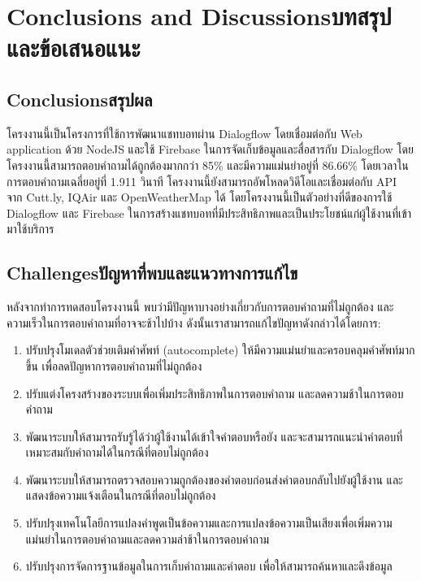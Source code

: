 \chapter{\ifenglish Conclusions and Discussions\else บทสรุปและข้อเสนอแนะ\fi}

\section{\ifenglish Conclusions\else สรุปผล\fi}

โครงงานนี้เป็นโครงการที่ใช้การพัฒนาแชทบอทผ่าน Dialogflow โดยเชื่อมต่อกับ Web application ด้วย NodeJS และใช้ Firebase
ในการจัดเก็บข้อมูลและสื่อสารกับ Dialogflow โดยโครงงานนี้สามารถตอบคำถามได้ถูกต้องมากกว่า 85\% และมีความแม่นยำอยู่ที่ 86.66\%
โดยเวลาในการตอบคำถามเฉลี่ยอยู่ที่ 1.911 วินาที โครงงานนี้ยังสามารถอัพโหลดวิดีโอและเชื่อมต่อกับ API จาก Cutt.ly, IQAir และ
OpenWeatherMap ได้ โดยโครงงานนี้เป็นตัวอย่างที่ดีของการใช้ Dialogflow และ Firebase
ในการสร้างแชทบอทที่มีประสิทธิภาพและเป็นประโยชน์แก่ผู้ใช้งานที่เข้ามาใช้บริการ

\section{\ifenglish Challenges\else ปัญหาที่พบและแนวทางการแก้ไข\fi}

หลังจากทำการทดสอบโครงงานนี้ พบว่ามีปัญหาบางอย่างเกี่ยวกับการตอบคำถามที่ไม่ถูกต้อง
และความเร็วในการตอบคำถามที่อาจจะช้าไปบ้าง ดังนั้นเราสามารถแก้ไขปัญหาดังกล่าวได้โดยการ:
\begin{enumerate}
  \item ปรับปรุงโมเดลตัวช่วยเติมคำศัพท์ (autocomplete) ให้มีความแม่นยำและครอบคลุมคำศัพท์มากขึ้น เพื่อลดปัญหาการตอบคำถามที่ไม่ถูกต้อง
  \item ปรับแต่งโครงสร้างของระบบเพื่อเพิ่มประสิทธิภาพในการตอบคำถาม และลดความช้าในการตอบคำถาม
  \item พัฒนาระบบให้สามารถรับรู้ได้ว่าผู้ใช้งานได้เข้าใจคำตอบหรือยัง และจะสามารถแนะนำคำตอบที่เหมาะสมกับคำถามได้ในกรณีที่ตอบไม่ถูกต้อง
  \item พัฒนาระบบให้สามารถตรวจสอบความถูกต้องของคำตอบก่อนส่งคำตอบกลับไปยังผู้ใช้งาน และแสดงข้อความแจ้งเตือนในกรณีที่ตอบไม่ถูกต้อง
  \item ปรับปรุงเทคโนโลยีการแปลงคำพูดเป็นข้อความและการแปลงข้อความเป็นเสียงเพื่อเพิ่มความแม่นยำในการตอบคำถามและลดความล่าช้าในการตอบคำถาม
  \item ปรับปรุงการจัดการฐานข้อมูลในการเก็บคำถามและคำตอบ เพื่อให้สามารถค้นหาและดึงข้อมูล
\end{enumerate}


